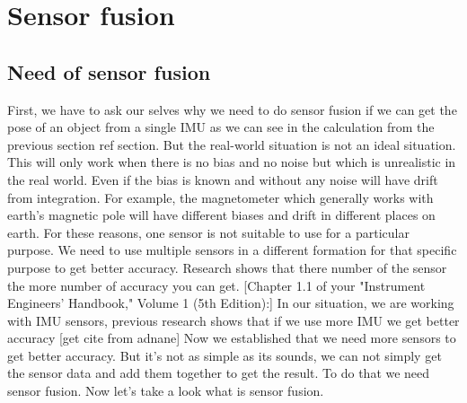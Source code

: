 \section{Sensor fusion}

\subsection{Need of sensor fusion}

First, we have to ask our selves why we need to do sensor fusion if we can get the pose of an object from a single IMU as we can see in the calculation from the previous section {ref section}. But the real-world situation is not an ideal situation. This will only work when there is no bias and no noise but which is unrealistic in the real world. Even if the bias is known and without any noise will have drift from integration. 
For example, the magnetometer which generally works with earth's magnetic pole will have different biases and drift in different places on earth. 
For these reasons, one sensor is not suitable to use for a particular purpose. We need to use multiple sensors in a different formation for that specific purpose to get better accuracy. 
Research shows that there number of the sensor the more number of accuracy you can get. [Chapter 1.1 of your "Instrument Engineers' Handbook," Volume 1 (5th Edition):]
In our situation, we are working with IMU sensors, previous research shows that if we use more IMU we get better accuracy [get cite from adnane]
Now we established that we need more sensors to get better accuracy. But it's not as simple as its sounds, we can not simply get the sensor data and add them together to get the result. To do that we need sensor fusion. Now let's take a look what is sensor fusion.



